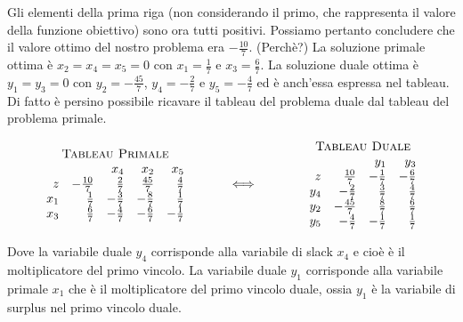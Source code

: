 \documentclass[10pt]{article}
\begin{document}
Gli elementi della prima riga (non considerando il primo, che rappresenta il valore della funzione obiettivo) sono ora tutti positivi.
Possiamo pertanto concludere che il valore ottimo del nostro
problema era $-\frac{10}{7}$.
(Perch\`e?)
La soluzione primale ottima \`e $x_2=x_4=x_5 = 0$
con $x_1=\frac{1}{7}$ e $x_3=\frac{6}{7}$.
La soluzione duale ottima \`e $y_1 = y_3 = 0$
con $y_2=-\frac{45}{7}$, $y_4=-\frac{2}{7}$ e $y_5=-\frac{4}{7}$
ed \`e anch'essa espressa nel tableau.\\

Di fatto \`e persino possibile ricavare
il tableau del problema duale
dal tableau del problema primale.

\[
   \begin{array}{c}
   \mbox{\sc Tableau Primale}\\ 
   \begin{array}{rrrrr}
   &	 & x_4  & x_2 & x_5  \\
   z  &  -\frac{10}{7} &  \frac{2}{7} & \frac{45}{7}  & \frac{4}{7} \\        
   x_1 &  \frac{1}{7} &  -\frac{3}{7} & -\frac{8}{7}   &  \frac{1}{7} \\
   x_3 & \frac{6}{7} &  -\frac{4}{7}  &  -\frac{6}{7}  &  -\frac{1}{7} \\
   \end{array}
   \end{array}
\hfill
\hspace{1cm}
{\Huge \Longleftrightarrow}
\hfill
\hspace{1.2cm}
   \begin{array}{c}
   \mbox{\sc Tableau Duale}\\ 
   \begin{array}{rrrr}
        & & y_1  & y_3  \\
       z  &  \frac{10}{7} & -\frac{1}{7}  & -\frac{6}{7} \\         
      y_4 &  -\frac{2}{7} & \frac{3}{7}  & \frac{4}{7} \\
      y_2 &  -\frac{45}{7} & \frac{8}{7}  & \frac{6}{7}\\
      y_5 &   -\frac{4}{7} & -\frac{1}{7}  & \frac{1}{7} \\
   \end{array}
   \end{array}
\]

Dove la variabile duale $y_4$ corrisponde alla variabile
di slack $x_4$ e cio\`e \`e il moltiplicatore del primo vincolo.
La variabile duale $y_1$ corrisponde alla variabile
primale $x_1$ che \`e il moltiplicatore del primo vincolo duale,
ossia $y_1$ \`e la variabile di surplus nel primo vincolo duale. 
\end{document}
